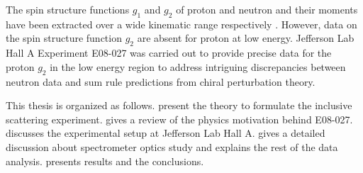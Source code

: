 The spin structure functions $g_1$ and $g_2$ of proton and neutron and their moments have been extracted over a wide kinematic range respectively \cite{Amarian2002,Amarian2004a,Amarian2004b,Wesselmann2007,Fatemi2003,Yun2003,Deur2004,Dharmawardane2004,Chen2004}. However, data on the spin structure function $g_2$ are absent for proton at low energy. Jefferson Lab Hall A Experiment E08-027 was carried out to provide precise data for the proton $g_2$ in the low energy region to address intriguing discrepancies between neutron data and sum rule predictions from chiral perturbation theory.

This thesis is organized as follows.  present the theory to formulate the inclusive scattering experiment.  gives a review of the physics motivation behind E08-027.  discusses the experimental setup at Jefferson Lab Hall A.  gives a detailed discussion about spectrometer optics study and  explains the rest of the data analysis.  presents results and the conclusions.

